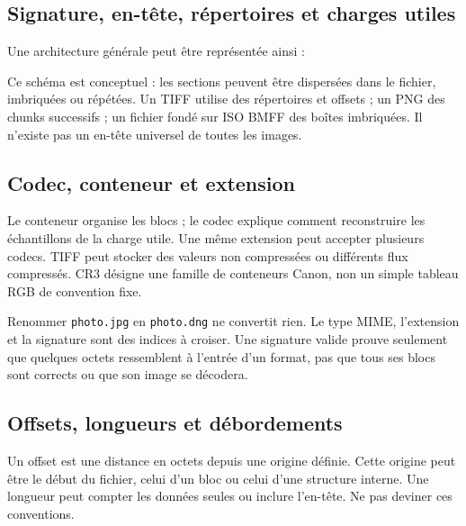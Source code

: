 \subsection{Signature, en-tête, répertoires et charges utiles}
Une architecture générale peut être représentée ainsi :
\begin{center}
\end{center}
Ce schéma est conceptuel : les sections peuvent être dispersées
dans le fichier, imbriquées ou répétées. Un TIFF utilise des
répertoires et offsets ; un PNG des chunks successifs ; un fichier
fondé sur ISO BMFF des boîtes imbriquées. Il n'existe pas un
en-tête universel de toutes les images.

\subsection{Codec, conteneur et extension}
Le conteneur organise les blocs ; le codec explique comment
reconstruire les échantillons de la charge utile. Une même
extension peut accepter plusieurs codecs. TIFF peut stocker des
valeurs non compressées ou différents flux compressés. CR3
désigne une famille de conteneurs Canon, non un simple tableau
RGB de convention fixe.

Renommer \texttt{photo.jpg} en \texttt{photo.dng} ne convertit rien.
Le type MIME, l'extension et la signature sont des indices à
croiser. Une signature valide prouve seulement que quelques
octets ressemblent à l'entrée d'un format, pas que tous ses blocs
sont corrects ou que son image se décodera.

\subsection{Offsets, longueurs et débordements}
Un offset est une distance en octets depuis une origine définie.
Cette origine peut être le début du fichier, celui d'un bloc ou
celui d'une structure interne. Une longueur peut compter les
données seules ou inclure l'en-tête. Ne pas deviner ces conventions.

